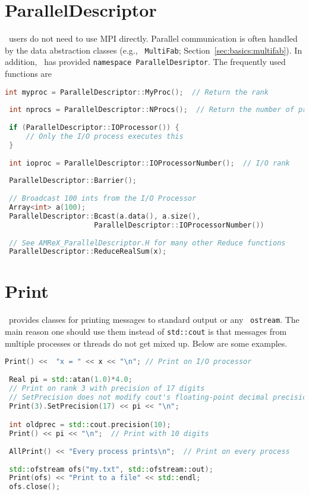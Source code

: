 \section{ParallelDescriptor}

\amrex\ users do not need to use MPI directly.  Parallel communication
is often handled by the data abstraction classes (e.g., {\tt
  MultiFab}; Section~\ref{sec:basics:multifab}).  In addition, \amrex\
has provided {\tt namespace ParallelDesriptor}.  The frequently used
functions are 
\begin{lstlisting}[language=cpp]
 int myproc = ParallelDescriptor::MyProc();  // Return the rank
 
 int nprocs = ParallelDescriptor::NProcs();  // Return the number of processes
 
 if (ParallelDescriptor::IOProcessor()) { 
     // Only the I/O process executes this
 }
 
 int ioproc = ParallelDescriptor::IOProcessorNumber();  // I/O rank
 
 ParallelDescriptor::Barrier();
 
 // Broadcast 100 ints from the I/O Processor
 Array<int> a(100);
 ParallelDescriptor::Bcast(a.data(), a.size(),
                     ParallelDescriptor::IOProcessorNumber())
 
 // See AMReX_ParallelDescriptor.H for many other Reduce functions 
 ParallelDescriptor::ReduceRealSum(x);
\end{lstlisting}

\section{Print}
\label{sec:basics:print}

\amrex\ provides classes for printing messages to standard output or
any \cpp\ {\tt ostream}.  The main reason one should use them instead
of {\tt std::cout} is that messages from multiple processes or
threads do not get mixed up.  Below are some examples.
\begin{lstlisting}[language=cpp]
 Print() <<  "x = " << x << "\n"; // Print on I/O processor
 
 Real pi = std::atan(1.0)*4.0;
 // Print on rank 3 with precision of 17 digits
 // SetPrecision does not modify cout's floating-point decimal precision setting.
 Print(3).SetPrecision(17) << pi << "\n";

 int oldprec = std::cout.precision(10);
 Print() << pi << "\n";  // Print with 10 digits
 
 AllPrint() << "Every process prints\n";  // Print on every process
 
 std::ofstream ofs("my.txt", std::ofstream::out);
 Print(ofs) << "Print to a file" << std::endl;
 ofs.close();
\end{lstlisting}

